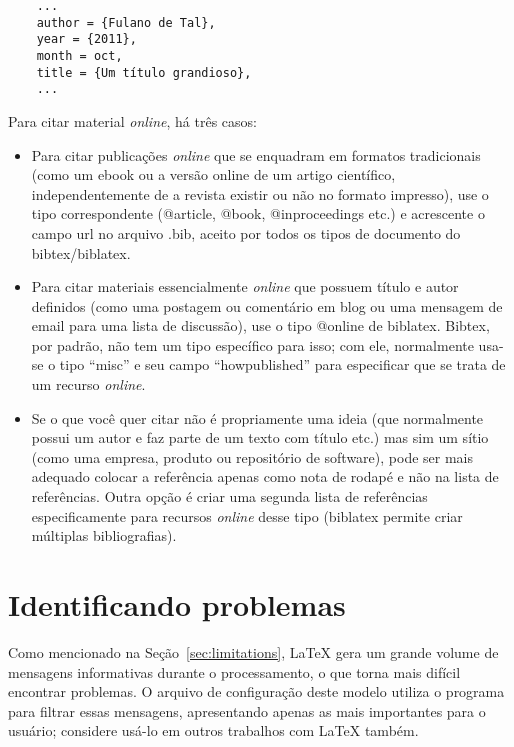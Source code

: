 \begin{verbatim}
    ...
    author = {Fulano de Tal},
    year = {2011},
    month = oct,
    title = {Um título grandioso},
    ...
\end{verbatim}

Para citar material \emph{online}, há três casos:

\begin{itemize}
  \item Para citar publicações \emph{online} que se enquadram em
  formatos tradicionais (como um ebook ou a versão online de um artigo
  científico, independentemente de a revista existir ou não no formato
  impresso), use o tipo correspondente (\textsf{@article}, \textsf{@book},
  \textsf{@inproceedings} etc.) e acrescente o campo \textsf{url} no
  arquivo .bib, aceito por todos os tipos de documento do bibtex/biblatex.

  \item Para citar materiais essencialmente \emph{online} que possuem
  título e autor definidos (como uma postagem ou comentário em blog
  ou uma mensagem de email para uma lista de discussão), use o tipo
  \textsf{@online} de biblatex. Bibtex, por padrão,
  não tem um tipo específico para isso; com ele, normalmente usa-se
  o tipo ``misc'' e seu campo ``howpublished'' para especificar que
  se trata de um recurso \emph{online}.

  \item Se o que você quer citar não é propriamente uma ideia (que
  normalmente possui um autor e faz parte de um texto com título etc.)
  mas sim um sítio (como uma empresa, produto ou repositório de
  software), pode ser mais adequado colocar a referência apenas como
  nota de rodapé e não na lista de referências. Outra opção é criar
  uma segunda lista de referências especificamente para recursos
  \emph{online} desse tipo (biblatex permite criar
  múltiplas bibliografias).
\end{itemize}

\section{Identificando problemas}

Como mencionado na Seção~\ref{sec:limitations}, \LaTeX{} gera um grande
volume de mensagens informativas durante o processamento, o que torna mais
difícil encontrar problemas. O arquivo de configuração  deste
modelo utiliza o programa  para filtrar essas mensagens,
apresentando apenas as mais importantes para o usuário; considere usá-lo
em outros trabalhos com \LaTeX{} também.

